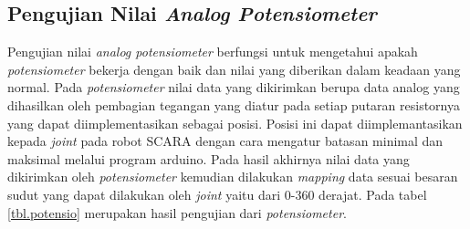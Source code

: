 \subsection{Pengujian Nilai\textit{ Analog Potensiometer}}
Pengujian nilai \textit{analog potensiometer} berfungsi untuk mengetahui apakah \textit{potensiometer} bekerja dengan baik dan nilai yang diberikan dalam keadaan yang normal. Pada \textit{potensiometer} nilai data yang dikirimkan berupa data analog yang dihasilkan oleh pembagian tegangan yang diatur pada setiap putaran resistornya yang dapat diimplementasikan sebagai posisi. Posisi ini dapat diimplemantasikan kepada \textit{joint} pada robot SCARA dengan cara mengatur batasan minimal dan maksimal melalui program arduino. Pada hasil akhirnya nilai data yang dikirimkan oleh \textit{potensiometer} kemudian dilakukan \textit{mapping} data sesuai besaran sudut yang dapat dilakukan oleh \textit{joint} yaitu dari 0-360 derajat. Pada tabel \ref{tbl.potensio}  merupakan hasil pengujian dari \textit{potensiometer}.

